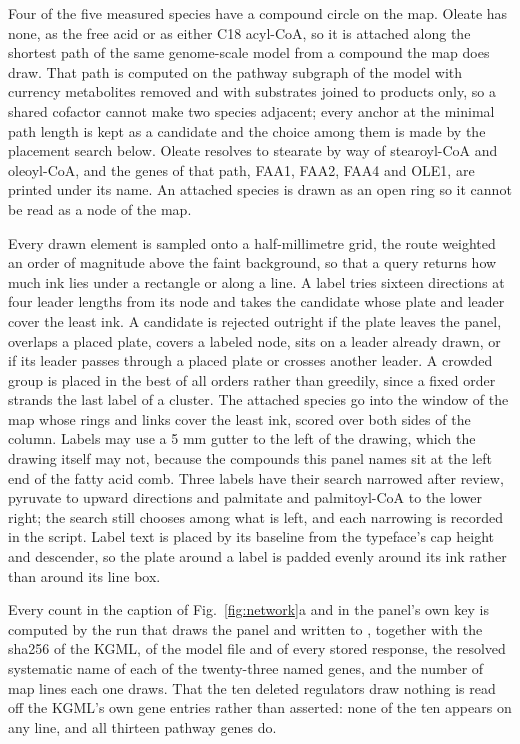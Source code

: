  Four of the five measured species have a compound
circle on the map. Oleate has none, as the free acid or as either C18 acyl-CoA, so it is
attached along the shortest path of the same genome-scale model from a compound the map
does draw. That path is computed on the pathway subgraph of the model with currency
metabolites removed and with substrates joined to products only, so a shared cofactor
cannot make two species adjacent; every anchor at the minimal path length is kept as a
candidate and the choice among them is made by the placement search below. Oleate resolves
to stearate by way of stearoyl-CoA and oleoyl-CoA, and the genes of that path, FAA1, FAA2,
FAA4 and OLE1, are printed under its name. An attached species is drawn as an open ring so
it cannot be read as a node of the map.

 Every drawn element is sampled onto a half-millimetre grid,
the route weighted an order of magnitude above the faint background, so that a query
returns how much ink lies under a rectangle or along a line. A label tries sixteen
directions at four leader lengths from its node and takes the candidate whose plate and
leader cover the least ink. A candidate is rejected outright if the plate leaves the
panel, overlaps a placed plate, covers a labeled node, sits on a leader already drawn, or
if its leader passes through a placed plate or crosses another leader. A crowded group is
placed in the best of all orders rather than greedily, since a fixed order strands the
last label of a cluster. The attached species go into the window of the map whose rings
and links cover the least ink, scored over both sides of the column. Labels may use a
5 mm gutter to the left of the drawing, which the drawing itself may not, because the
compounds this panel names sit at the left end of the fatty acid comb. Three labels have
their search narrowed after review, pyruvate to upward directions and palmitate and
palmitoyl-CoA to the lower right; the search still chooses among what is left, and each
narrowing is recorded in the script. Label text is placed by its baseline from the
typeface's cap height and descender, so the plate around a label is padded evenly around
its ink rather than around its line box.

 Every count in the caption of
Fig.~\ref{fig:network}a and in the panel's own key is computed by the run that draws the
panel and written to , together with the sha256 of
the KGML, of the model file and of every stored response, the resolved systematic name of
each of the twenty-three named genes, and the number of map lines each one draws. That the
ten deleted regulators draw nothing is read off the KGML's own gene entries rather than
asserted: none of the ten appears on any line, and all thirteen pathway genes do.

